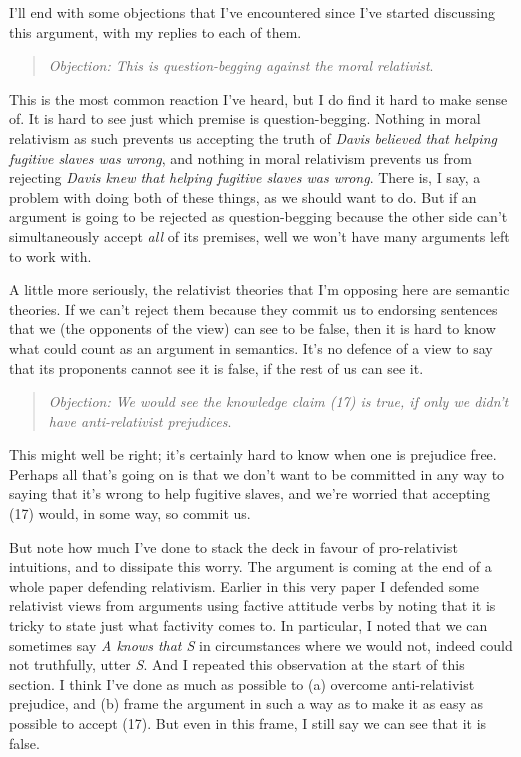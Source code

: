 I'll end with some objections that I've encountered since I've started discussing this argument, with my replies to each of them.

\begin{quote}
\textit{Objection: This is question-begging against the moral relativist}.
\end{quote}

\noindent This is the most common reaction I've heard, but I do find it hard to make sense of. It is hard to see just which premise is question-begging. Nothing in moral relativism as such prevents us accepting the truth of  \textit{Davis believed that helping fugitive slaves was wrong}, and nothing in moral relativism prevents us from rejecting \textit{Davis knew that helping fugitive slaves was wrong}. There is, I say, a problem with doing both of these things, as we should want to do. But if an argument is going to be rejected as question-begging because the other side can't simultaneously accept \textit{all} of its premises, well we won't have many arguments left to work with.

A little more seriously, the relativist theories that I'm opposing here are semantic theories. If we can't reject them because they commit us to endorsing sentences that we (the opponents of the view) can see to be false, then it is hard to know what could count as an argument in semantics. It's no defence of a view to say that its proponents cannot see it is false, if the rest of us can see it.

\begin{quote}
\textit{Objection: We would see the knowledge claim (17) is true, if only we didn't have anti-relativist prejudices}.
\end{quote}

\noindent This might well be right; it's certainly hard to know when one is prejudice free. Perhaps all that's going on is that we don't want to be committed in any way to saying that it's wrong to help fugitive slaves, and we're worried that accepting (17) would, in some way, so commit us.  

But note how much I've done to stack the deck in favour of pro-relativist intuitions, and to dissipate this worry. The argument is coming at the end of a whole paper defending relativism. Earlier in this very paper I defended some relativist views from arguments using factive attitude verbs by noting that it is tricky to state just what factivity comes to. In particular, I noted that we can sometimes say \textit{A knows that S} in circumstances where we would not, indeed could not truthfully, utter \textit{S}. And I repeated this observation at the start of this section. I think I've done as much as possible to (a) overcome anti-relativist prejudice, and (b) frame the argument in such a way as to make it as easy as possible to accept (17). But even in this frame, I still say we can see that it is false.

